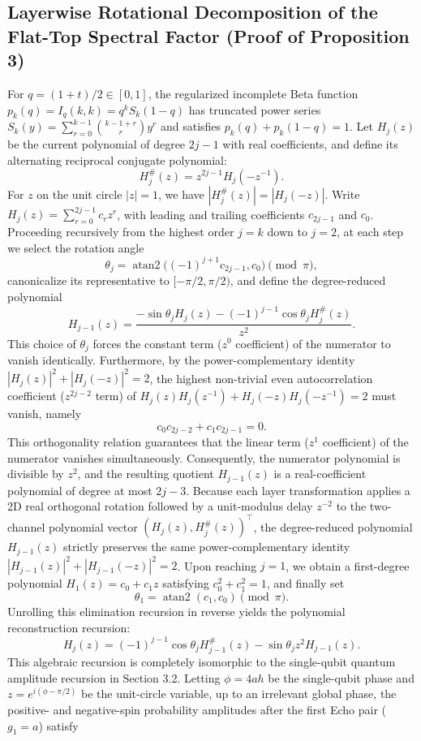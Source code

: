 \documentclass{article}
\theoremstyle{plain}
\theoremstyle{definition}
\begin{document}
\subsection{Layerwise Rotational Decomposition of the Flat-Top Spectral Factor (Proof of Proposition 3)}\label{subsec:a_2}

For $q=(1+t)/2\in[0,1]$, the regularized incomplete Beta function $p_k(q)=I_q(k,k)=q^kS_k(1-q)$ has truncated power series $S_k(y)=\sum_{r=0}^{k-1}\binom{k-1+r}{r}y^r$ and satisfies $p_k(q)+p_k(1-q)=1$. Let $H_j(z)$ be the current polynomial of degree $2j-1$ with real coefficients, and define its alternating reciprocal conjugate polynomial:
\[
H_j^\#(z)=z^{2j-1}H_j(-z^{-1}).
\]
For $z$ on the unit circle $|z|=1$, we have $|H_j^\#(z)|=|H_j(-z)|$. Write $H_j(z)=\sum_{r=0}^{2j-1}c_rz^r$, with leading and trailing coefficients $c_{2j-1}$ and $c_0$. Proceeding recursively from the highest order $j=k$ down to $j=2$, at each step we select the rotation angle
\[
\theta_j=\operatorname{atan2}\big((-1)^{j+1}c_{2j-1},c_0\big)\pmod\pi,
\]
canonicalize its representative to $[-\pi/2,\pi/2)$, and define the degree-reduced polynomial
\[
H_{j-1}(z)=
\frac{-\sin\theta_jH_j(z)
-(-1)^{j-1}\cos\theta_jH_j^\#(z)}{z^2}.
\]
This choice of $\theta_j$ forces the constant term ($z^0$ coefficient) of the numerator to vanish identically. Furthermore, by the power-complementary identity $|H_j(z)|^2+|H_j(-z)|^2=2$, the highest non-trivial even autocorrelation coefficient ($z^{2j-2}$ term) of $H_j(z)H_j(z^{-1})+H_j(-z)H_j(-z^{-1})=2$ must vanish, namely
\[
c_0c_{2j-2}+c_1c_{2j-1}=0.
\]
This orthogonality relation guarantees that the linear term ($z^1$ coefficient) of the numerator vanishes simultaneously. Consequently, the numerator polynomial is divisible by $z^2$, and the resulting quotient $H_{j-1}(z)$ is a real-coefficient polynomial of degree at most $2j-3$. Because each layer transformation applies a 2D real orthogonal rotation followed by a unit-modulus delay $z^{-2}$ to the two-channel polynomial vector $(H_j(z), H_j^\#(z))^\top$, the degree-reduced polynomial $H_{j-1}(z)$ strictly preserves the same power-complementary identity $|H_{j-1}(z)|^2+|H_{j-1}(-z)|^2=2$. Upon reaching $j=1$, we obtain a first-degree polynomial $H_1(z)=c_0+c_1z$ satisfying $c_0^2+c_1^2=1$, and finally set
\[
\theta_1=\operatorname{atan2}(c_1,c_0)\pmod\pi.
\]
Unrolling this elimination recursion in reverse yields the polynomial reconstruction recursion:
\[
H_j(z)=(-1)^{j-1}\cos\theta_jH_{j-1}^\#(z)
-\sin\theta_jz^2H_{j-1}(z).
\]
This algebraic recursion is completely isomorphic to the single-qubit quantum amplitude recursion in Section 3.2. Letting $\phi=4ah$ be the single-qubit phase and $z=e^{i(\phi-\pi/2)}$ be the unit-circle variable, up to an irrelevant global phase, the positive- and negative-spin probability amplitudes after the first Echo pair ($g_1=a$) satisfy
\end{document}
